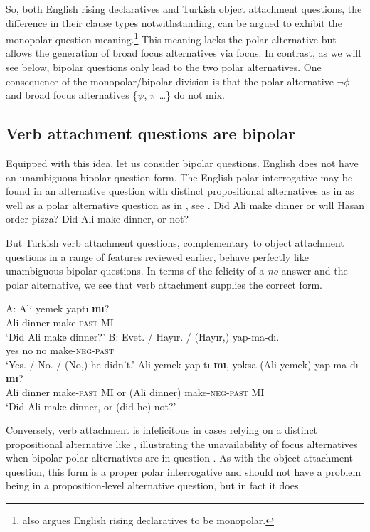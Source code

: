 \documentclass[output=paper,colorlinks,citecolor=brown]{langscibook}
\begin{document}
So, both English rising declaratives and Turkish object attachment questions, the difference in their clause types notwithstanding, can be argued to exhibit the monopolar question meaning.\footnote{\citet{rudin-rd} also argues English rising declaratives to be monopolar.} This meaning lacks the polar alternative but allows the generation of broad focus alternatives via focus. In contrast, as we will see below, bipolar questions only lead to the two polar alternatives. One consequence of the monopolar/bipolar division is that the polar alternative $\neg\phi$ and broad focus alternatives \{$\psi$, $\pi$ \ldots\} do not mix.  

\subsection{Verb attachment questions are bipolar}\label{sec:11:3:2}

Equipped with this idea, let us consider bipolar questions. English does not have an unambiguous bipolar question form. The English polar interrogative may be found in an alternative question with distinct propositional alternatives as in  as well as a polar alternative question as in , see .
\ea \label{pi} 
\ea Did Ali make dinner or will Hasan order pizza?
\ex Did Ali make dinner, or not?
\z
\z

 But Turkish verb attachment questions, complementary to object attachment questions in a range of features reviewed earlier, behave perfectly like unambiguous bipolar questions. In terms of the felicity of a \textit{no} answer and the polar alternative, we see that verb attachment supplies the correct form.

\ea \label{va-answer} 
\ea
A: \gll Ali yemek yaptı{} \textbf{mı}?\\
Ali dinner make-\textsc{past} MI \\
\glt \phantom{A:} `Did Ali make dinner?'
\ex B: \gll Evet. / Hayır. / (Hayır,) yap-ma-dı.\\
yes {} no {} \phantom{(}no make-\textsc{neg-past}\\
\glt \phantom{B:} `Yes. / No. / (No,) he didn't.'
\z
\ex \gll Ali yemek yap-tı{} \textbf{mı}, yoksa (Ali yemek) yap-ma-dı{} \textbf{mı}?\\
Ali dinner make-\textsc{past} MI or (Ali dinner) make-\textsc{neg-past} MI\\
\glt `Did Ali make dinner, or (did he) not?' \label{polalt-va} 
\z
 
Conversely, verb attachment is infelicitous in cases relying on a distinct propositional alternative like , illustrating the unavailability of focus alternatives when bipolar polar alternatives are in question . As with the object attachment question, this form is a proper polar interrogative and should not have a problem being in a proposition-level alternative question, but in fact it does.  
\end{document}
